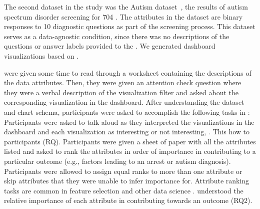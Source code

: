 The second dataset in the study
was the Autism dataset~\cite{autism},
 the results of autism spectrum
disorder screening for 704 .
The attributes in the dataset are binary responses
to 10 diagnostic questions
as part of the screening process.
This dataset serves as a data-agnostic condition,
since there was no descriptions
of the questions or answer labels provided to the
.
We generated dashboard visualizations
based on .

were given some time to read through a worksheet
containing the descriptions of the data attributes.
Then, they were given an attention check question
where they were
a verbal description of the visualization filter
and asked about the corresponding visualization in the dashboard.
After understanding the dataset and chart schema,
participants were asked to accomplish the following
tasks in :
Participants were asked to talk aloud
as they interpreted the visualizations
in the dashboard and 
each visualization as interesting or
not interesting, .
This 
how 
to participants (RQ).%
Participants were given a sheet of paper
with all the attributes listed
and asked to rank the attributes
in order of importance in contributing
to a particular outcome (e.g., factors leading to an arrest or autism diagnosis). Participants were allowed to assign equal ranks to more than one attribute or skip attributes that they were unable to infer importance for.
Attribute ranking tasks are common in feature selection and other data science .
understood the relative importance of each attribute in contributing towards an outcome (RQ2).
